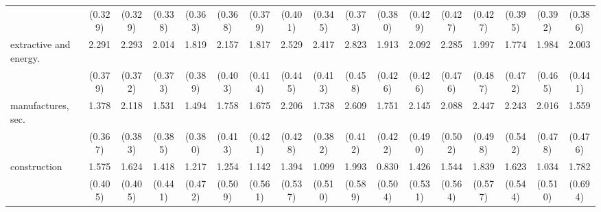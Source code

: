{\begin{tabular}{l*{16}{c}}
                    &     (0.329)         &     (0.329)         &     (0.338)         &     (0.363)         &     (0.368)         &     (0.379)         &     (0.401)         &     (0.345)         &     (0.373)         &     (0.380)         &     (0.429)         &     (0.427)         &     (0.427)         &     (0.395)         &     (0.392)         &     (0.386)         \\
[1em]
extractive and energy.&       2.291\sym{***}&       2.293\sym{***}&       2.014\sym{***}&       1.819\sym{***}&       2.157\sym{***}&       1.817\sym{***}&       2.529\sym{***}&       2.417\sym{***}&       2.823\sym{***}&       1.913\sym{***}&       2.092\sym{***}&       2.285\sym{***}&       1.997\sym{***}&       1.774\sym{***}&       1.984\sym{***}&       2.003\sym{***}\\
                    &     (0.379)         &     (0.372)         &     (0.373)         &     (0.389)         &     (0.403)         &     (0.414)         &     (0.445)         &     (0.413)         &     (0.458)         &     (0.426)         &     (0.426)         &     (0.476)         &     (0.487)         &     (0.472)         &     (0.465)         &     (0.441)         \\
[1em]
manufactures, sec.  &       1.378\sym{***}&       2.118\sym{***}&       1.531\sym{***}&       1.494\sym{***}&       1.758\sym{***}&       1.675\sym{***}&       2.206\sym{***}&       1.738\sym{***}&       2.609\sym{***}&       1.751\sym{***}&       2.145\sym{***}&       2.088\sym{***}&       2.447\sym{***}&       2.243\sym{***}&       2.016\sym{***}&       1.559\sym{**} \\
                    &     (0.367)         &     (0.383)         &     (0.385)         &     (0.380)         &     (0.413)         &     (0.421)         &     (0.428)         &     (0.382)         &     (0.412)         &     (0.422)         &     (0.490)         &     (0.502)         &     (0.498)         &     (0.542)         &     (0.478)         &     (0.476)         \\
[1em]
construction        &       1.575\sym{***}&       1.624\sym{***}&       1.418\sym{**} &       1.217\sym{**} &       1.254\sym{*}  &       1.142\sym{*}  &       1.394\sym{**} &       1.099\sym{*}  &       1.993\sym{***}&       0.830         &       1.426\sym{**} &       1.544\sym{**} &       1.839\sym{**} &       1.623\sym{**} &       1.034\sym{*}  &       1.782\sym{*}  \\
                    &     (0.405)         &     (0.405)         &     (0.441)         &     (0.472)         &     (0.509)         &     (0.561)         &     (0.537)         &     (0.510)         &     (0.589)         &     (0.504)         &     (0.531)         &     (0.564)         &     (0.577)         &     (0.544)         &     (0.510)         &     (0.694)         \\

\end{tabular}}
